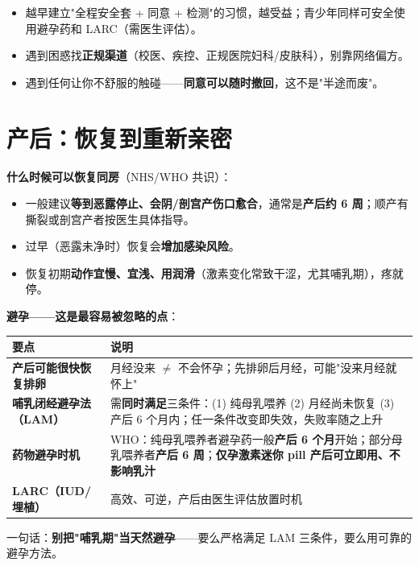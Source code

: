 \begin{itemize}[leftmargin=2em,itemsep=0.3em]
  \item 越早建立"全程安全套 + 同意 + 检测"的习惯，越受益；青少年同样可安全使用避孕药和 LARC（需医生评估）。
  \item 遇到困惑找\textbf{正规渠道}（校医、疾控、正规医院妇科/皮肤科），别靠网络偏方。
  \item 遇到任何让你不舒服的触碰——\textbf{同意可以随时撤回}，这不是"半途而废"。
\end{itemize}

\section{产后：恢复到重新亲密}

\textbf{什么时候可以恢复同房}（NHS/WHO 共识）：

\begin{itemize}[leftmargin=2em,itemsep=0.3em]
  \item 一般建议\textbf{等到恶露停止、会阴/剖宫产伤口愈合}，通常是\textbf{产后约 6 周}；顺产有撕裂或剖宫产者按医生具体指导。
  \item 过早（恶露未净时）恢复会\textbf{增加感染风险}。
  \item 恢复初期\textbf{动作宜慢、宜浅、用润滑}（激素变化常致干涩，尤其哺乳期），疼就停。
\end{itemize}

\textbf{避孕——这是最容易被忽略的点}：

\begin{tabularx}{\linewidth}{X X}
\toprule
\textbf{要点} & \textbf{说明} \\
\midrule
\textbf{产后可能很快恢复排卵} & 月经没来 $\ne$ 不会怀孕；先排卵后月经，可能"没来月经就怀上" \\
\textbf{哺乳闭经避孕法（LAM）} & 需\textbf{同时满足}三条件：(1) 纯母乳喂养 (2) 月经尚未恢复 (3) 产后 6 个月内；任一条件改变即失效，失败率随之上升 \\
\textbf{药物避孕时机} & WHO：纯母乳喂养者避孕药一般\textbf{产后 6 个月}开始；部分母乳喂养者\textbf{产后 6 周}；\textbf{仅孕激素迷你 pill 产后可立即用、不影响乳汁} \\
\textbf{LARC（IUD/埋植）} & 高效、可逆，产后由医生评估放置时机 \\
\bottomrule
\end{tabularx}

\vspace{0.5em}
\noindent 一句话：\textbf{别把"哺乳期"当天然避孕}——要么严格满足 LAM 三条件，要么用可靠的避孕方法。

